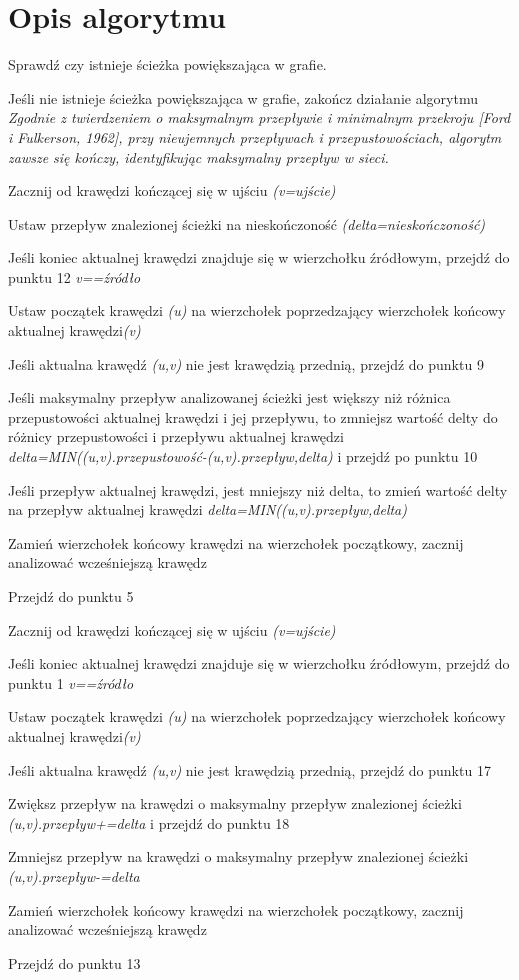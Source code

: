 \documentclass[10pt]{minutes}
\begin{document}
\section{Opis algorytmu}
\begin{enumerate}
\item{Sprawdź czy istnieje ścieżka powiększająca w grafie.}
\item{Jeśli nie istnieje ścieżka powiększająca w grafie, zakończ działanie algorytmu}
\\\emph{Zgodnie z twierdzeniem o maksymalnym przepływie i minimalnym przekroju [Ford i Fulkerson, 1962], przy nieujemnych przepływach i przepustowościach, algorytm zawsze się kończy, identyfikując maksymalny przepływ w sieci.}
\item{Zacznij od krawędzi kończącej się w ujściu \emph{(v=ujście)}
\item{Ustaw przepływ znalezionej ścieżki na nieskończoność \emph{(delta=nieskończoność)}
\item{Jeśli koniec aktualnej krawędzi znajduje się w wierzchołku źródłowym, przejdź do punktu 12 \emph{v==źródło}}
\item{Ustaw początek krawędzi \emph{(u)} na wierzchołek poprzedzający wierzchołek końcowy aktualnej krawędzi\emph{(v)}}
\item{Jeśli aktualna krawędź \emph{(u,v)} nie jest krawędzią przednią, przejdź do punktu 9}
\item{Jeśli maksymalny przepływ analizowanej ścieżki jest większy niż różnica przepustowości aktualnej krawędzi i jej przepływu, to zmniejsz wartość delty do różnicy przepustowości i przepływu aktualnej krawędzi \emph{delta=MIN((u,v).przepustowość-(u,v).przepływ,delta)} i przejdź po punktu 10}
\item{Jeśli przepływ aktualnej krawędzi, jest mniejszy niż delta, to zmień wartość delty na przepływ aktualnej krawędzi \emph{delta=MIN((u,v).przepływ,delta)}}
\item{Zamień wierzchołek końcowy krawędzi na wierzchołek początkowy, zacznij analizować wcześniejszą krawędz}
\item{Przejdź do punktu 5}
\item{Zacznij od krawędzi kończącej się w ujściu \emph{(v=ujście)}
\item{Jeśli koniec aktualnej krawędzi znajduje się w wierzchołku źródłowym, przejdź do punktu 1 \emph{v==źródło}}
\item{Ustaw początek krawędzi \emph{(u)} na wierzchołek poprzedzający wierzchołek końcowy aktualnej krawędzi\emph{(v)}}
\item{Jeśli aktualna krawędź \emph{(u,v)} nie jest krawędzią przednią, przejdź do punktu 17}
\item{Zwiększ przepływ na krawędzi o maksymalny przepływ znalezionej ścieżki \emph{(u,v).przepływ+=delta} i przejdź do punktu 18}
\item{Zmniejsz przepływ na krawędzi o maksymalny przepływ znalezionej ścieżki \emph{(u,v).przepływ-=delta}}
\item{Zamień wierzchołek końcowy krawędzi na wierzchołek początkowy, zacznij analizować wcześniejszą krawędz}
\item{Przejdź do punktu 13}

}}}
\end{enumerate}
\end{document}
